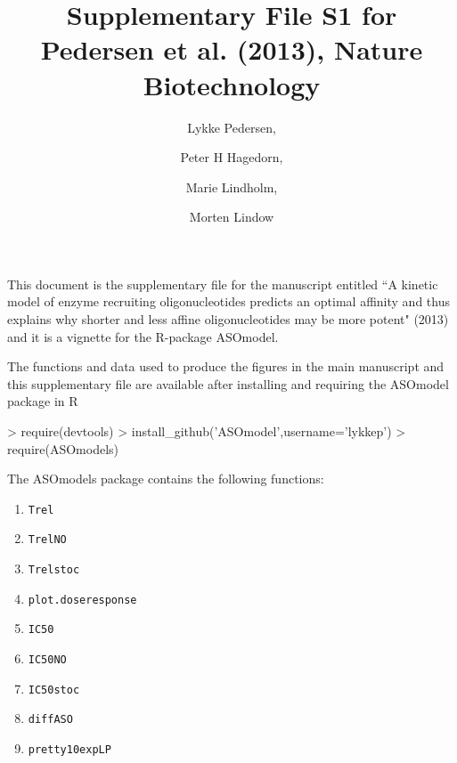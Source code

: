 \documentclass[a4paper,11pt]{article}
\title{Supplementary File S1 for Pedersen et al. (2013), Nature Biotechnology}
\author{Lykke Pedersen, \and Peter H Hagedorn, \and Marie Lindholm, \and Morten Lindow}
\date{}
\begin{document}

\maketitle

This document is the supplementary file for the manuscript entitled ``A kinetic model of enzyme recruiting oligonucleotides predicts an optimal affinity and thus explains why shorter and less affine oligonucleotides may be more potent" (2013) and it is a vignette for the R-package ASOmodel.

The functions and data used to produce the figures in the main manuscript and this supplementary file are available after installing and requiring the ASOmodel package in R
\begin{Schunk}
\begin{Sinput}
> require(devtools)
> install_github('ASOmodel',username='lykkep')
> require(ASOmodels)
\end{Sinput}
\end{Schunk}
The ASOmodels package contains the following functions:
\begin{enumerate}
\item \texttt{Trel}
\item \texttt{TrelNO}
\item \texttt{Trelstoc}
\item \texttt{plot.doseresponse}
\item \texttt{IC50}
\item \texttt{IC50NO}
\item \texttt{IC50stoc}
\item \texttt{diffASO}
\item \texttt{pretty10expLP}
\end{enumerate}

\newpage

\tableofcontents
\end{document}
